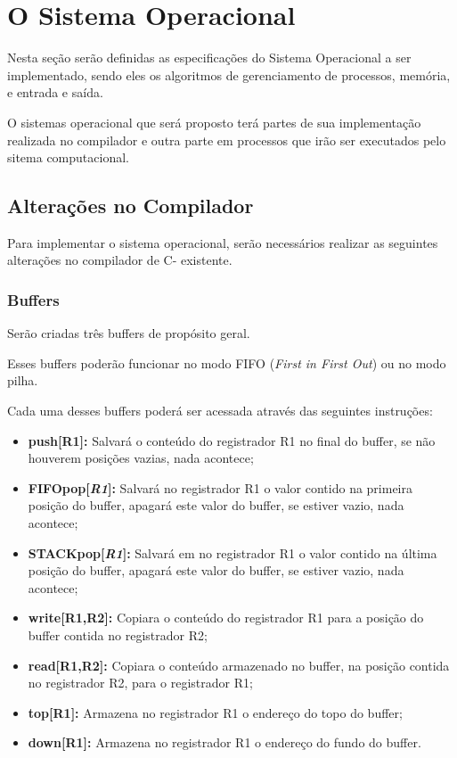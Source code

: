 \section{O Sistema Operacional}

Nesta seção serão definidas as especificações do Sistema Operacional a ser implementado, sendo eles os algoritmos de gerenciamento de processos, memória, e entrada e saída.

O sistemas operacional que será proposto terá partes de sua implementação realizada no compilador e outra parte em processos que irão ser executados pelo sitema computacional.

\subsection{Alterações no Compilador}

Para implementar o sistema operacional, serão necessários realizar as seguintes alterações no compilador de C- existente.

\subsubsection{Buffers}

Serão criadas três buffers de propósito geral.

Esses buffers poderão funcionar no modo FIFO (\textit{First in First Out}) ou no modo pilha.

Cada uma desses buffers poderá ser acessada através das seguintes instruções:

\begin{itemize}
	\item \textbf{push[R1]:} Salvará o conteúdo do registrador R1 no final do buffer, se não houverem posições vazias, nada acontece;
	
	\item \textbf{FIFOpop[\textit{R1}]:} Salvará no registrador R1 o valor contido na primeira posição do buffer, apagará este valor do buffer, se estiver vazio, nada acontece;
		
	\item \textbf{STACKpop[\textit{R1}]:} Salvará em no registrador R1 o valor contido na última posição do buffer, apagará este valor do buffer, se estiver vazio, nada acontece;
	
	\item \textbf{write[R1,R2]:} Copiara o conteúdo do registrador R1 para a posição do buffer contida no registrador R2; 
	
	\item \textbf{read[R1,R2]:} Copiara o conteúdo armazenado no buffer, na posição contida no registrador R2, para o registrador R1;
	
	\item \textbf{top[R1]:} Armazena no registrador R1 o endereço do topo do buffer;

	\item \textbf{down[R1]:} Armazena no registrador R1 o endereço do fundo do buffer.
\end{itemize}

